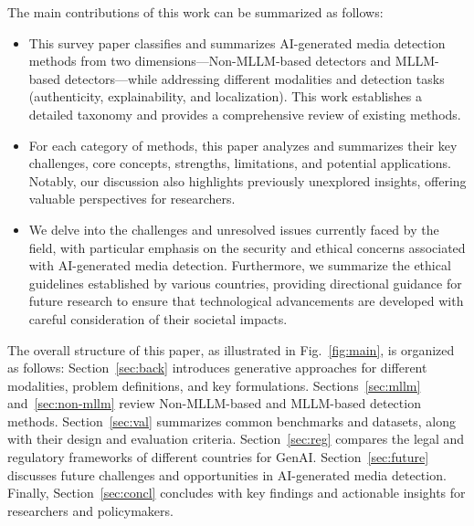 The main contributions of this work can be summarized as follows:
\begin{itemize}
    \item This survey paper classifies and summarizes AI-generated media detection methods from two dimensions—Non-MLLM-based detectors and MLLM-based detectors—while addressing different modalities and detection tasks (authenticity, explainability, and localization). This work establishes a detailed taxonomy and provides a comprehensive review of existing methods.
    \item For each category of methods, this paper analyzes and summarizes their key challenges, core concepts, strengths, limitations, and potential applications. Notably, our discussion also highlights previously unexplored insights, offering valuable perspectives for researchers. 
    \item We delve into the challenges and unresolved issues currently faced by the field, with particular emphasis on the security and ethical concerns associated with AI-generated media detection. Furthermore, we summarize the ethical guidelines established by various countries, providing directional guidance for future research to ensure that technological advancements are developed with careful consideration of their societal impacts.
\end{itemize}

The overall structure of this paper, as illustrated in Fig.~\ref{fig:main}, is organized as follows: Section~\ref{sec:back} introduces generative approaches for different modalities, problem definitions, and key formulations. Sections~\ref{sec:mllm} and~\ref{sec:non-mllm} review Non-MLLM-based and MLLM-based detection methods. Section~\ref{sec:val} summarizes common benchmarks and datasets, along with their design and evaluation criteria. Section~\ref{sec:reg} compares the legal and regulatory frameworks of different countries for GenAI. Section~\ref{sec:future} discusses future challenges and opportunities in AI-generated media detection. Finally, Section~\ref{sec:concl} concludes with key findings and actionable insights for researchers and policymakers.




 

